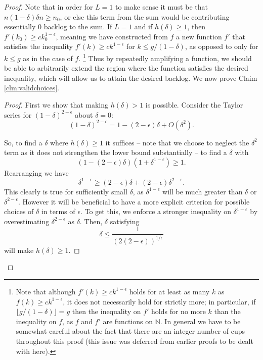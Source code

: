\documentclass[twocolumn]{article}[10pt]
\begin{document}
\begin{proof}
  Note that in order for $L =1$ to make sense it must be that
  $n(1-\delta)\delta n \ge n_0$, or else this term from the sum would be
  contributing essentially $0$ backlog to the sum.
  If $L=1$ and if $h(\delta)\ge 1$, then $f'(k_0) \ge c k_0^{1-\epsilon}$, meaning
  we have constructed from $f$ a new function $f'$ that satisfies the
  inequality $f'(k) \ge ck^{1-\epsilon}$ for $k\le g/(1-\delta)$, as opposed to
  only for $k \le g$ as in the case of $f$. 
  \footnote{Note that although $f'(k) \ge ck^{1-\epsilon}$ holds for at least
    as many $k$ as $f(k) \ge c k^{1-\epsilon}$, it does not necessarily hold
    for strictly more; in particular, if $\lfloor g/(1-\delta) \rfloor = g$
    then the inequality on $f'$ holds for no more $k$ than the inequality on
    $f$, as $f$ and $f'$ are functions on $\mathbb{N}$. In general we have to
    be somewhat careful about the fact that there are an integer number of cups
    throughout this proof (this issue was deferred from earlier proofs to be
  dealt with here).} 
  Thus by repeatedly amplifying a function, we should be able to arbitrarily
  extend the region where the function satisfies the desired inequality, which
  will allow us to attain the desired backlog.
  We now prove Claim \ref{clm:validchoices}.
  \begin{proof}
    First we show that making $h(\delta) > 1$ is possible.
  Consider the Taylor series for $(1-\delta)^{2-\epsilon}$ about $\delta = 0$:
  $$(1-\delta)^{2-\epsilon} = 1 - (2-\epsilon)\delta + O(\delta^2).$$
 
  So, to find a $\delta$ where $h(\delta) \ge 1$ it suffices -- note that we
  choose to neglect the $\delta^2$ term as it does not strengthen the lower
  bound substantially -- to find a $\delta$ with
  $$(1-(2-\epsilon)\delta)(1+\delta^{1-\epsilon}) \ge 1.$$
  Rearranging we have 
  $$\delta^{1-\epsilon} \ge (2-\epsilon)\delta + (2-\epsilon)\delta^{2-\epsilon}.$$
  This clearly is true for sufficiently small $\delta$, as
  $\delta^{1-\epsilon}$ will be much greater than $\delta$ or
  $\delta^{2-\epsilon}$.
  However it will be beneficial to have a more explicit criterion for possible
  choices of $\delta$ in terms of $\epsilon$. To get this, we enforce a 
  stronger inequality on $\delta^{1-\epsilon}$ by overestimating
  $\delta^{2-\epsilon}$ as $\delta$. 
  Then, $\delta$ satisfying
  \begin{equation}
    \label{eqn:deltaUpperIneq}
    \delta \le \frac{1}{(2(2-\epsilon))^{1/\epsilon}}
  \end{equation}
  will make $h(\delta) \ge 1.$


\end{proof}
\end{proof}
\end{document}
